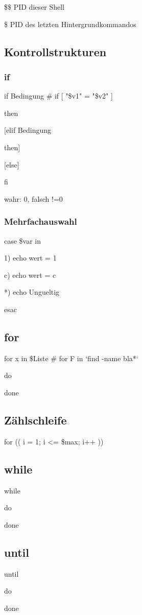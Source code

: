 \$\$ PID dieser Shell

\$\! PID des letzten Hintergrundkommandos


\subsection*{Kontrollstrukturen}
\subsubsection*{if}
if Bedingung     \# if [ "\$v1" = "\$v2" ]

then

[elif Bedingung

then]

[else] 

fi
 
wahr: 0, falsch !=0
\subsubsection*{Mehrfachauswahl}
case \$var in

  1) echo wert = 1

  c) echo wert = c

  *) echo Ungueltig

esac 

\subsection*{for}
for x in \$Liste \# for F in `find -name bla*`

do 
   
done 

\subsection*{Zählschleife}
for (( i = 1; i <= \$max; i++ ))

\subsection*{while}
while 

do 
  
done
\subsection*{until}
until 

do 

done
